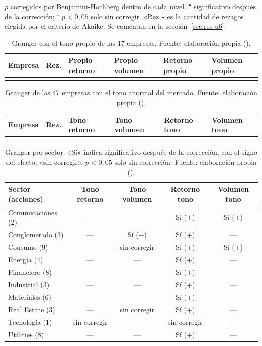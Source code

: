 $p$ corregidos por Benjamini-Hochberg dentro de cada nivel. ${}^{\bullet}$ significativo
después de la corrección; ${}^{\circ}$ $p<0{,}05$ solo sin corregir. «Rez.» es la cantidad de
rezagos elegida por el criterio de Akaike. Se comentan en la sección~\ref{sec:res-u6}.

{\small
\begin{longtable}{@{}lcC{2.55cm}C{2.55cm}C{2.55cm}C{2.55cm}@{}}
\toprule
\textbf{Empresa} & \textbf{Rez.} & \textbf{Propio \flecha{} retorno} & \textbf{Propio \flecha{} volumen} & \textbf{Retorno \flecha{} propio} & \textbf{Volumen \flecha{} propio} \\
\midrule
\endhead
\bottomrule
\caption{Granger con el tono propio de las 17 empresas. Fuente: elaboración propia
().}
\label{tab:granger-propio}
\endlastfoot

\end{longtable}

\begin{longtable}{@{}lcC{2.55cm}C{2.55cm}C{2.55cm}C{2.55cm}@{}}
\toprule
\textbf{Empresa} & \textbf{Rez.} & \textbf{Tono \flecha{} retorno} & \textbf{Tono \flecha{} volumen} & \textbf{Retorno \flecha{} tono} & \textbf{Volumen \flecha{} tono} \\
\midrule
\endhead
\bottomrule
\caption{Granger de las 47 empresas con el tono anormal del mercado. Fuente: elaboración
propia ().}
\label{tab:granger-empresas}
\endlastfoot

\end{longtable}
}

\begin{table}[H]
\centering\footnotesize
\begin{tabular}{@{}lcccc@{}}
\toprule
\textbf{Sector (acciones)} & \textbf{Tono \flecha{} retorno} & \textbf{Tono \flecha{} volumen} & \textbf{Retorno \flecha{} tono} & \textbf{Volumen \flecha{} tono} \\
\midrule
Comunicaciones (2) & — & — & Sí (+) & Sí (+) \\
Conglomerado (3) & — & Sí ($-$) & Sí (+) & — \\
Consumo (9) & — & sin corregir & Sí (+) & Sí (+) \\
Energía (4) & — & — & Sí (+) & — \\
Financiero (8) & — & — & Sí (+) & — \\
Industrial (3) & — & — & Sí (+) & — \\
Materiales (6) & — & — & Sí (+) & — \\
Real Estate (3) & — & sin corregir & Sí (+) & — \\
Tecnología (1) & sin corregir & — & sin corregir & — \\
Utilities (8) & — & — & Sí (+) & — \\
\bottomrule
\end{tabular}
\caption{Granger por sector. «Sí» indica significativo después de la corrección, con el signo
del efecto; «sin corregir», $p<0{,}05$ solo sin corrección. Fuente: elaboración propia
().}
\label{tab:granger-sectores}
\end{table}

